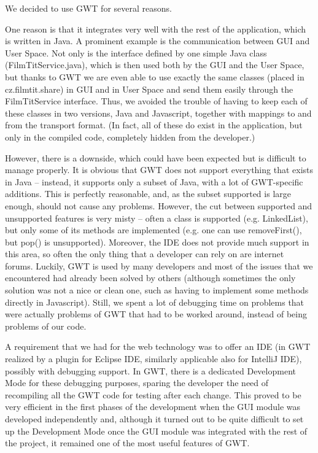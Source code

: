 
We decided to use GWT for several reasons.

One reason is that it integrates very well with the rest of the application, which is written in Java. A prominent example is the communication between GUI and User Space. Not only is the interface defined by one simple Java class (FilmTitService.java), which is then used both by the GUI and the User Space, but thanks to GWT we are even able to use exactly the same classes (placed in cz.filmtit.share) in GUI and in User Space and send them easily through the FilmTitService interface. Thus, we avoided the trouble of having to keep each of these classes in two versions, Java and Javascript, together with mappings to and from the transport format. (In fact, all of these do exist in the application, but only in the compiled code, completely hidden from the developer.)

However, there is a downside, which could have been expected but is difficult to manage properly. It is obvious that GWT does not support everything that exists in Java -- instead, it supports only a subset of Java, with a lot of GWT-specific additions. This is perfectly reasonable, and, as the subset supported is large enough, should not cause any problems. However, the cut between supported and unsupported features is very misty -- often a class is supported (e.g. LinkedList), but only some of its methods are implemented (e.g. one can use removeFirst(), but pop() is unsupported). Moreover, the IDE does not provide much support in this area, so often the only thing that a developer can rely on are internet forums. Luckily, GWT is used by many developers and most of the issues that we encountered had already been solved by others (although sometimes the only solution was not a nice or clean one, such as having to implement some methods directly in Javascript). Still, we spent a lot of debugging time on problems that were actually problems of GWT that had to be worked around, instead of being problems of our code.

A requirement that we had for the web technology was to offer an IDE (in GWT realized by a plugin for Eclipse IDE, similarly applicable also for IntelliJ IDE), possibly with debugging support. In GWT, there is a dedicated Development Mode for these debugging purposes, sparing the developer the need of recompiling all the GWT code for testing after each change. This proved to be very efficient in the first phases of the development when the GUI module was developed independently and, although it turned out to be quite difficult to set up the Development Mode once the GUI module was integrated with the rest of the project, it remained one of the most useful features of GWT.

